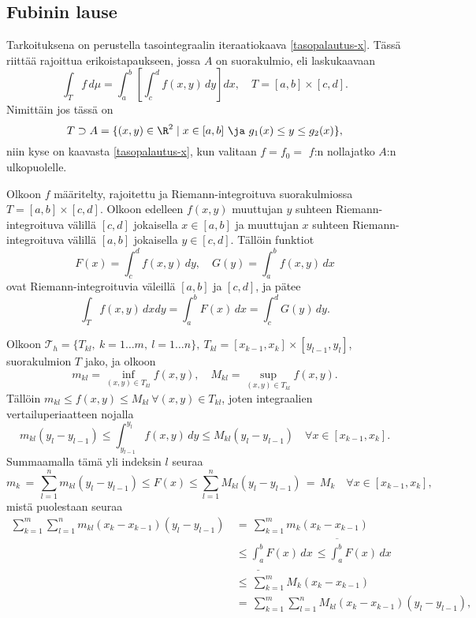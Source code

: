 \subsection{Fubinin lause}

Tarkoituksena on perustella tasointegraalin iteraatiokaava \eqref{tasopalautus-x}. Tässä riittää
rajoittua erikoistapaukseen, jossa $A$ on suorakulmio, eli laskukaavaan
\[
\int_T f\,d\mu = \int_a^b\left[\int_c^d f(x,y)\,dy\right]dx, \quad T = [a,b] \times [c,d].
\]
Nimittäin jos tässä on
\[ 
T \supset A = \{(x,y) \in \R^2 \mid x \in [a,b]\ \ja\ g_1(x) \le y \le g_2(x) \}, 
\]
niin kyse on kaavasta \eqref{tasopalautus-x}, kun valitaan $f=f_0=$ $f$:n nollajatko $A$:n 
ulkopuolelle.
\begin{Lause} \label{Fubini}  
Olkoon $f$ määritelty, rajoitettu ja 
Riemann-integroituva suorakulmiossa $T=[a,b]\times [c,d]$. Olkoon edelleen $f(x,y)$ muuttujan
$y$ suhteen Riemann-integroituva välillä $[c,d]$ jokaisella $x \in [a,b]$ ja muuttujan $x$ 
suhteen Riemann-integroituva välillä $[a,b]$ jokaisella $y \in [c,d]$. Tällöin funktiot
\[ 
F(x) = \int_c^d f(x,y)\,dy, \quad G(y) = \int_a^b f(x,y)\,dx 
\]
ovat Riemann-integroituvia väleillä $[a,b]$ ja $[c,d]$, ja pätee
\[ 
\int_T f(x,y)\,dxdy = \int_a^b F(x)\,dx = \int_c^d G(y)\,dy. 
\]
\end{Lause}
\tod Olkoon $\mathcal{T}_h = \{T_{kl},\ k=1\ldots m,\ l=1\ldots n\},\ 
T_{kl}=[x_{k-1},x_k]\times[y_{l-1},y_l]$, suorakulmion $T$ jako, ja olkoon
\[ 
m_{kl} = \inf_{(x,y) \in T_{kl}} f(x,y), \quad M_{kl} = \sup_{(x,y) \in T_{kl}} f(x,y). 
\]
Tällöin $m_{kl} \le f(x,y) \le M_{kl}\ \forall (x,y) \in T_{kl}$, joten integraalien 
vertailuperiaatteen nojalla
\[ 
m_{kl}(y_l-y_{l-1}) \le \int_{y_{l-1}}^{y_l} f(x,y)\,dy 
                    \le M_{kl}(y_l-y_{l-1}) \quad \forall x \in [x_{k-1},x_k]. 
\]
Summaamalla tämä yli indeksin $l$ seuraa
\[ 
m_k\,=\,\sum_{l=1}^n m_{kl}(y_l-y_{l-1}) \le F(x) 
         \le \sum_{l=1}^n M_{kl}(y_l-y_{l-1})\,=\,M_k \quad \forall x \in [x_{k-1},x_k], 
\]
mistä puolestaan seuraa
\begin{align*}
\sum_{k=1}^m\sum_{l=1}^n m_{kl}(x_k-x_{k-1})(y_l-y_{l-1})\,
                &=\,\sum_{k=1}^m m_k(x_k-x_{k-1}) \\
                &\le \underline{\int_a^b}F(x)\,dx\,\le \overline{\int_a^b}F(x)\,dx \\
                &\le\,\sum_{k=1}^m M_k(x_k-x_{k-1}) \\
                &=\,\sum_{k=1}^m\sum_{l=1}^n M_{kl}(x_k-x_{k-1})(y_l-y_{l-1}),
\end{align*}
